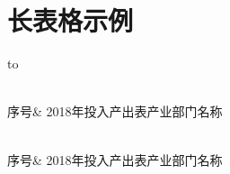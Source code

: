 
\chapter{长表格示例}

\begin{small}
    \begin{longtabu} to \textwidth {X[-1cp]X[1cp]}
        \caption{产业部门划分表}\\
        \toprule
        序号&
        2018年投入产出表产业部门名称\\
        \midrule
        \endfirsthead

        \\
        \toprule
        序号&
        2018年投入产出表产业部门名称\\
        \midrule
        \endhead

        \bottomrule
        \\
        \endfoot

        \bottomrule
        \endlastfoot


\end{longtabu}
\end{small}
